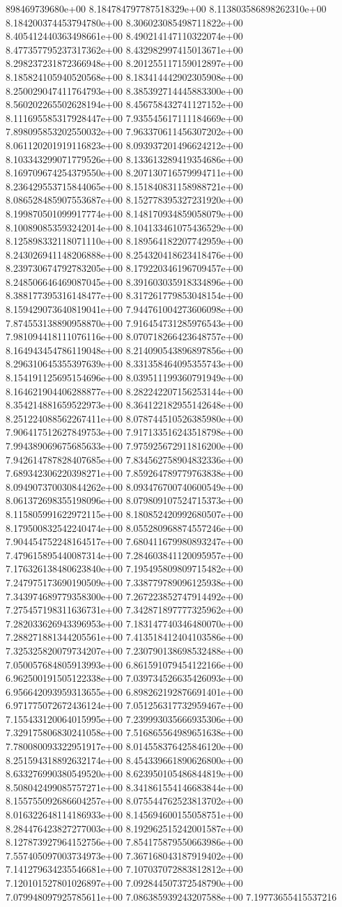 898469739680e+00	8.184784797787518329e+00	8.113803586898262310e+00	8.184200374453794780e+00	8.306023085498711822e+00	8.405412440363498661e+00	8.490214147110322074e+00	8.477357795237317362e+00	8.432982997415013671e+00	8.298237231872366948e+00	8.201255117159012897e+00	8.185824105940520568e+00	8.183414442902305908e+00	8.250029047411764793e+00	8.385392714445883300e+00	8.560202265502628194e+00	8.456758432741127152e+00	8.111695585317928447e+00	7.935545617111184669e+00	7.898095853202550032e+00	7.963370611456307202e+00	8.061120201919116823e+00	8.093937201496624212e+00	8.103343299071779526e+00	8.133613289419354686e+00	8.169709674254379550e+00	8.207130716579994711e+00	8.236429553715844065e+00	8.151840831158988721e+00	8.086528485907553687e+00	8.152778395327231920e+00	8.199870501099917774e+00	8.148170934859058079e+00	8.100890853593242014e+00	8.104133461075436529e+00	8.125898332118071110e+00	8.189564182207742959e+00	8.243026941148206888e+00	8.254320418623418476e+00	8.239730674792783205e+00	8.179220346196709457e+00	8.248506646469087045e+00	8.391603035918334896e+00	8.388177395316148477e+00	8.317261779853048154e+00	8.159429073640819041e+00	7.944761004273606098e+00	7.874553138890958870e+00	7.916454731285976543e+00	7.981094418111076116e+00	8.070718266423648757e+00	8.164943454786119048e+00	8.214090543896897856e+00	8.296310645355397639e+00	8.331358464095355743e+00	8.154191125695154696e+00	8.039511199360791949e+00	8.164621904406288877e+00	8.282242207156253144e+00	8.354214881659522973e+00	8.364122182955142648e+00	8.251224088562267411e+00	8.078744510526385980e+00	7.906417512627849753e+00	7.917133516243518798e+00	7.994389069675685633e+00	7.975925672911816200e+00	7.942614787828407685e+00	7.834562758904832336e+00	7.689342306220398271e+00	7.859264789779763838e+00	8.094907370030844262e+00	8.093476700740600549e+00	8.061372698355198096e+00	8.079809107524715373e+00	8.115805991622972115e+00	8.180852420992680507e+00	8.179500832542240474e+00	8.055280968874557246e+00	7.904454752248164517e+00	7.680411679980893247e+00	7.479615895440087314e+00	7.284603841120095957e+00	7.176326138480623840e+00	7.195495809809715482e+00	7.247975173690190509e+00	7.338779789096125938e+00	7.343974689779358300e+00	7.267223852747914492e+00	7.275457198311636731e+00	7.342871897777325962e+00	7.282033626943396953e+00	7.183147740346480070e+00	7.288271881344205561e+00	7.413518412404103586e+00	7.325325820079734207e+00	7.230790138698532488e+00	7.050057684805913993e+00	6.861591079454122166e+00	6.962500191505122338e+00	7.039734526635426093e+00	6.956642093959313655e+00	6.898262192876691401e+00	6.971775072672436124e+00	7.051256317732959467e+00	7.155433120064015995e+00	7.239993035666935306e+00	7.329175806830241058e+00	7.516865564989651638e+00	7.780080093322951917e+00	8.014558376425846120e+00	8.251594318892632174e+00	8.454339661890626800e+00	8.633276990380549520e+00	8.623950105486844819e+00	8.508042499085757271e+00	8.341861554146683844e+00	8.155755092686604257e+00	8.075544762523813702e+00	8.016322648114186933e+00	8.145694600155058751e+00	8.284476423827277003e+00	8.192962515242001587e+00	8.127873927964152756e+00	7.854175879550663986e+00	7.557405097003734973e+00	7.367168043187919402e+00	7.141279634235546681e+00	7.107037072883812812e+00	7.120101527801026897e+00	7.092844507372548790e+00	7.079948097925785611e+00	7.086385939243207588e+00	7.19773655415537216